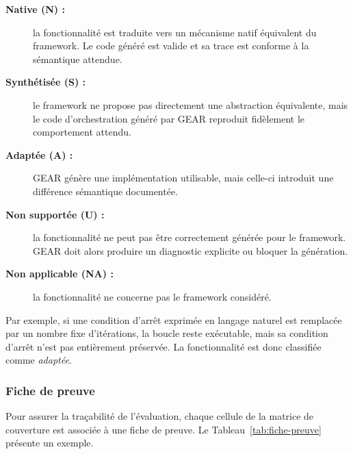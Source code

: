 \begin{description}
    \item[\textbf{Native (N) :}]
    la fonctionnalité est traduite vers un mécanisme natif équivalent
    du framework. Le code généré est valide et sa trace est conforme à
    la sémantique attendue.

    \item[\textbf{Synthétisée (S) :}]
    le framework ne propose pas directement une abstraction
    équivalente, mais le code d'orchestration généré par GEAR reproduit
    fidèlement le comportement attendu.

    \item[\textbf{Adaptée (A) :}]
    GEAR génère une implémentation utilisable, mais celle-ci introduit
    une différence sémantique documentée.

    \item[\textbf{Non supportée (U) :}]
    la fonctionnalité ne peut pas être correctement générée pour le
    framework. GEAR doit alors produire un diagnostic explicite ou
    bloquer la génération.

    \item[\textbf{Non applicable (NA) :}]
    la fonctionnalité ne concerne pas le framework considéré.
\end{description}

Par exemple, si une condition d'arrêt exprimée en langage naturel est
remplacée par un nombre fixe d'itérations, la boucle reste exécutable,
mais sa condition d'arrêt n'est pas entièrement préservée. La
fonctionnalité est donc classifiée comme \emph{adaptée}.


\subsubsection{Fiche de preuve}

Pour assurer la traçabilité de l'évaluation, chaque cellule de la
matrice de couverture est associée à une fiche de preuve. Le
Tableau~\ref{tab:fiche-preuve} présente un exemple.

